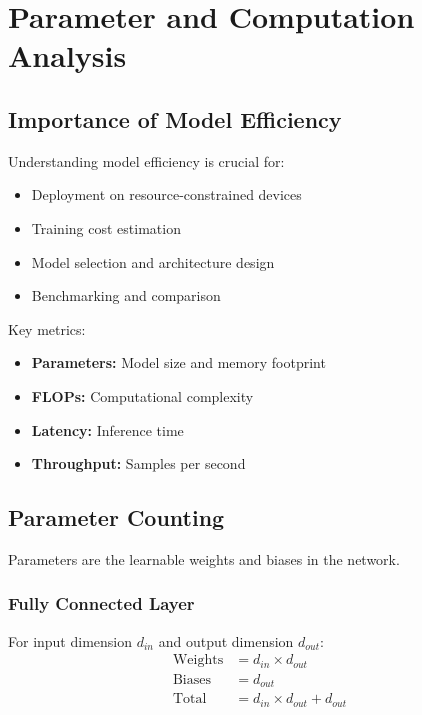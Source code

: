 \clearpage
\cleardoublepage

\chapter{Parameter and Computation Analysis}

\section{Importance of Model Efficiency}

Understanding model efficiency is crucial for:
\begin{itemize}
    \item Deployment on resource-constrained devices
    \item Training cost estimation
    \item Model selection and architecture design
    \item Benchmarking and comparison
\end{itemize}

Key metrics:
\begin{itemize}
    \item \textbf{Parameters:} Model size and memory footprint
    \item \textbf{FLOPs:} Computational complexity
    \item \textbf{Latency:} Inference time
    \item \textbf{Throughput:} Samples per second
\end{itemize}

\section{Parameter Counting}

Parameters are the learnable weights and biases in the network.

\subsection{Fully Connected Layer}

For input dimension $d_{in}$ and output dimension $d_{out}$:
\begin{align}
\text{Weights} &= d_{in} \times d_{out} \\
\text{Biases} &= d_{out} \\
\text{Total} &= d_{in} \times d_{out} + d_{out}
\end{align}

